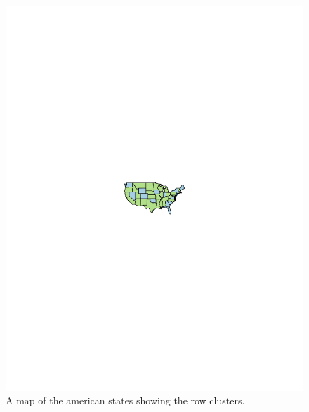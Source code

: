\documentclass[12pt,a4paper]{article}
\begin{document}
\begin{figure}[H]
	\begin{center}
		\includegraphics[width=\columnwidth]{Cases_map.pdf}
		\caption{A map of the american states showing the row clusters.}
		
	\end{center}
\end{figure}
\end{document}
